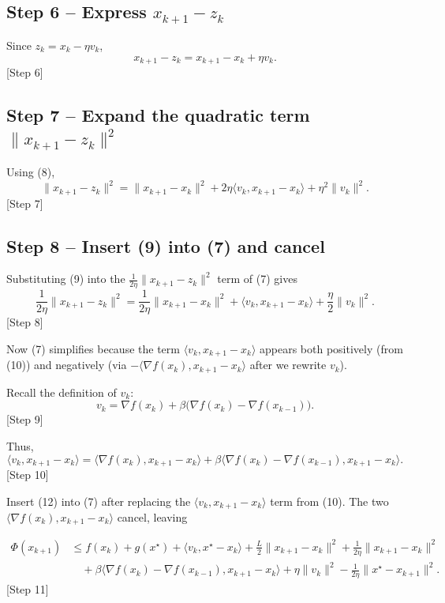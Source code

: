 \documentclass{article}
\begin{document}
\subsection*{Step 6 – Express $x_{k+1}-z_{k}$}
Since $z_{k}=x_{k}-\eta v_{k}$,
\[
x_{k+1}-z_{k}=x_{k+1}-x_{k}+\eta v_{k}. \tag{8}
\]
[Step 6]

\subsection*{Step 7 – Expand the quadratic term $\|x_{k+1}-z_{k}\|^{2}$}
Using (8),
\[
\|x_{k+1}-z_{k}\|^{2}
=\|x_{k+1}-x_{k}\|^{2}+2\eta\langle v_{k},x_{k+1}-x_{k}\rangle+\eta^{2}\|v_{k}\|^{2}. \tag{9}
\]
[Step 7]

\subsection*{Step 8 – Insert (9) into (7) and cancel}
Substituting (9) into the $\frac{1}{2\eta}\|x_{k+1}-z_{k}\|^{2}$ term of (7) gives
\[
\frac{1}{2\eta}\|x_{k+1}-z_{k}\|^{2}
=\frac{1}{2\eta}\|x_{k+1}-x_{k}\|^{2}
+\langle v_{k},x_{k+1}-x_{k}\rangle
+\frac{\eta}{2}\|v_{k}\|^{2}. \tag{10}
\]
[Step 8]

Now (7) simplifies because the term $\langle v_{k},x_{k+1}-x_{k}\rangle$ appears both positively (from (10)) and negatively (via $-\langle\nabla f(x_{k}),x_{k+1}-x_{k}\rangle$ after we rewrite $v_{k}$).  

Recall the definition of $v_{k}$:
\[
v_{k}= \nabla f(x_{k})+\beta\bigl(\nabla f(x_{k})-\nabla f(x_{k-1})\bigr). \tag{11}
\]
[Step 9]

Thus,
\[
\langle v_{k},x_{k+1}-x_{k}\rangle
= \langle\nabla f(x_{k}),x_{k+1}-x_{k}\rangle
+ \beta\langle\nabla f(x_{k})-\nabla f(x_{k-1}),x_{k+1}-x_{k}\rangle. \tag{12}
\]
[Step 10]

Insert (12) into (7) after replacing the $\langle v_{k},x_{k+1}-x_{k}\rangle$ term from (10). The two $\langle\nabla f(x_{k}),x_{k+1}-x_{k}\rangle$ cancel, leaving

\[
\begin{aligned}
\Phi(x_{k+1}) 
&\le f(x_{k})+g(x^{\star})
+\langle v_{k},x^{\star}-x_{k}\rangle
+\frac{L}{2}\|x_{k+1}-x_{k}\|^{2}
+\frac{1}{2\eta}\|x_{k+1}-x_{k}\|^{2}\\
&\quad+\beta\langle\nabla f(x_{k})-\nabla f(x_{k-1}),x_{k+1}-x_{k}\rangle
+\eta\|v_{k}\|^{2}
-\frac{1}{2\eta}\|x^{\star}-x_{k+1}\|^{2}. \tag{13}
\end{aligned}
\]
[Step 11]
\end{document}
